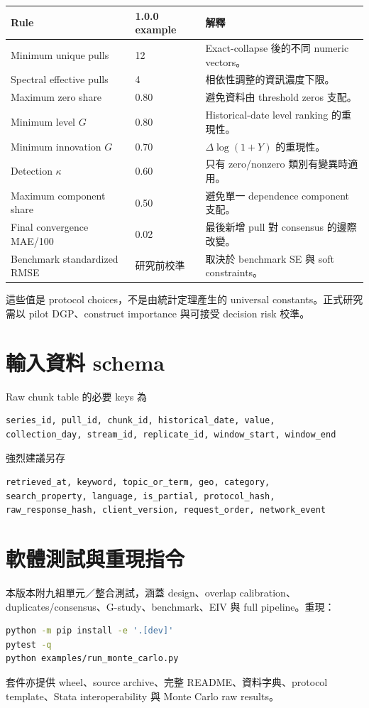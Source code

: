 \documentclass[12pt,a4paper,oneside]{article}
\begin{document}
\begin{longtable}{p{4.7cm}p{3.2cm}p{6.0cm}}
\toprule
Rule & 1.0.0 example & 解釋\\
\midrule
Minimum unique pulls & 12 & Exact-collapse 後的不同 numeric vectors。\\
Spectral effective pulls & 4 & 相依性調整的資訊濃度下限。\\
Maximum zero share & 0.80 & 避免資料由 threshold zeros 支配。\\
Minimum level $G$ & 0.80 & Historical-date level ranking 的重現性。\\
Minimum innovation $G$ & 0.70 & $\Delta\log(1+Y)$ 的重現性。\\
Detection $\kappa$ & 0.60 & 只有 zero/nonzero 類別有變異時適用。\\
Maximum component share & 0.50 & 避免單一 dependence component 支配。\\
Final convergence MAE/100 & 0.02 & 最後新增 pull 對 consensus 的邊際改變。\\
Benchmark standardized RMSE & 研究前校準 & 取決於 benchmark SE 與 soft constraints。\\
\bottomrule
\end{longtable}

這些值是 protocol choices，不是由統計定理產生的 universal constants。正式研究需以 pilot DGP、construct importance 與可接受 decision risk 校準。

\section{輸入資料 schema}

Raw chunk table 的必要 keys 為
\begin{lstlisting}
series_id, pull_id, chunk_id, historical_date, value,
collection_day, stream_id, replicate_id, window_start, window_end
\end{lstlisting}
強烈建議另存
\begin{lstlisting}
retrieved_at, keyword, topic_or_term, geo, category,
search_property, language, is_partial, protocol_hash,
raw_response_hash, client_version, request_order, network_event
\end{lstlisting}

\section{軟體測試與重現指令}

本版本附九組單元／整合測試，涵蓋 design、overlap calibration、duplicates/consensus、G-study、benchmark、EIV 與 full pipeline。重現：
\begin{lstlisting}[language=bash]
python -m pip install -e '.[dev]'
pytest -q
python examples/run_monte_carlo.py
\end{lstlisting}
套件亦提供 wheel、source archive、完整 README、資料字典、protocol template、Stata interoperability 與 Monte Carlo raw results。
\end{document}
